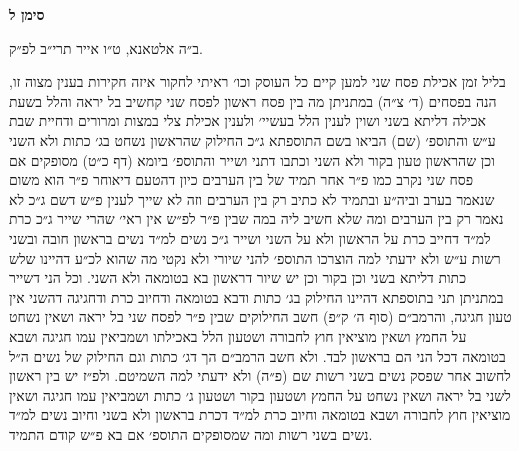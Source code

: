 \documentclass[12pt, openany]{book}
\newcommand{\chapname}{}
\newcommand{\newchap}[1]{
	\addcontentsline{toc}{chapter}{#1}
	\renewcommand{\chapname}{#1}
		\begin{center}
			\textbf{%
\fontsize{16pt}{16pt}\selectfont
				#1}
		\end{center}
}
\begin{document}
\newchap{סימן ל}
\begin{multicols}{2}
ב״ה אלטאנא, ט״ו אייר תרי״ב לפ״ק.\\\vspace{0pt}

בליל זמן אכילת פסח שני למען קיים כל העוסק וכו׳ ראיתי לחקור איזה חקירות בענין מצוה זו, הנה בפסחים (ד׳ צ״ה) במתניתן מה בין פסח ראשון לפסח שני קחשיב בל יראה והלל בשעת אכילה דליתא בשני ושוין לענין הלל בעשיי׳ ולענין אכילת צלי במצות ומרורים ודחיית שבת ע״ש והתוספ׳ (שם) הביאו בשם התוספתא ג״כ החילוק שהראשון נשחט בג׳ כתות ולא השני וכן שהראשון טעון בקור ולא השני וכתבו דתני ושייר והתוספ׳ ביומא (דף כ״ט) מסופקים אם פסח שני נקרב כמו פ״ר אחר תמיד של בין הערבים כיון דהטעם דיאוחר פ״ר הוא משום שנאמר בערב וביה״ע ובתמיד לא כתיב רק בין הערבים וזה לא שייך לענין פ״ש דשם ג״כ לא נאמר רק בין הערבים ומה שלא חשיב ליה במה שבין פ״ר לפ״ש אין ראי׳ שהרי שייר ג״כ כרת למ״ד דחייב כרת על הראשון ולא על השני ושייר ג״כ נשים למ״ד נשים בראשון חובה ובשני רשות ע״ש ולא ידעתי למה הוצרכו התוספ׳ להני שיורי ולא נקטי מה שהוא לכ״ע דהיינו שלש כתות דליתא בשני וכן בקור וכן יש שיור דראשון בא בטומאה ולא השני. וכל הני דשייר במתניתן תני בתוספתא דהיינו החילוק בג׳ כתות ודבא בטומאה ודחיוב כרת ודחגיגה דהשני אין טעון חגיגה, והרמב״ם (סוף ה׳ ק״פ) חשב החילוקים שבין פ״ר לפסח שני בל יראה ושאין נשחט על החמץ ושאין מוציאין חוץ לחבורה ושטעון הלל באכילתו ושמביאין עמו חגיגה ושבא בטומאה דכל הני הם בראשון לבד. ולא חשב הרמב״ם הך דג׳ כתות וגם החילוק של נשים ה״ל לחשוב אחר שפסק נשים בשני רשות שם (פ״ה) ולא ידעתי למה השמיטם. ולפ״ז יש בין ראשון לשני בל יראה ושאין נשחט על החמץ ושטעון בקור ושטעון ג׳ כתות ושמביאין עמו חגיגה ושאין מוציאין חוץ לחבורה ושבא בטומאה וחיוב כרת למ״ד דכרת בראשון ולא בשני וחיוב נשים למ״ד נשים בשני רשות ומה שמסופקים התוספ׳ אם בא פ״ש קודם התמיד.\\\vspace{0pt}


\end{multicols}
\end{document}
